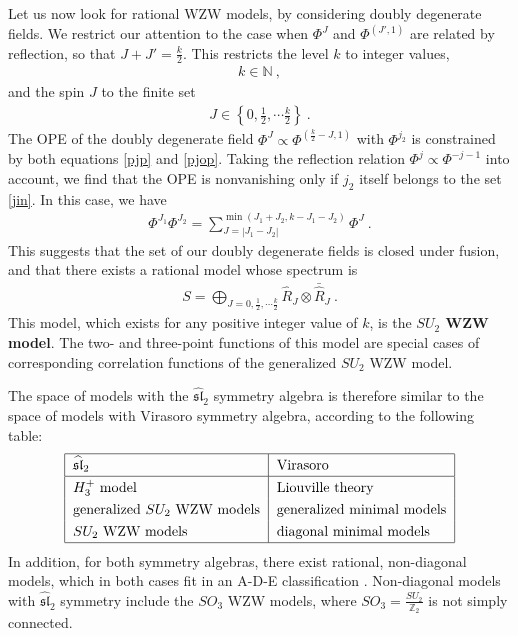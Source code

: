 \documentclass[12pt, a4paper, notitlepage, twoside]{report}
\numberwithin{equation}{section}
\theoremstyle{break}
\begin{document}
Let us now look for rational WZW models, by considering doubly degenerate fields.
We restrict our attention to the case when $\Phi^{J}$ and $\Phi^{(J',1)}$ are related by reflection, so that $J+J'=\frac{k}{2}$.
This restricts the level $k$ to integer values,  
\begin{align}
 \boxed{k\in {\mathbb{N}}}\ ,
\end{align}
and the spin $J$ to the finite set 
\begin{align}
 J\in \left\{0,\frac12,\cdots \frac{k}{2}\right\}\ .
\label{jin}
\end{align}
The OPE of the doubly degenerate field $\Phi^J \propto \Phi^{(\frac{k}{2}-J,1)}$ with $\Phi^{j_2}$ is constrained by both equations \eqref{pjp} and \eqref{pjop}.
Taking the reflection relation $\Phi^j\propto \Phi^{-j-1}$ into account, we find that the OPE is nonvanishing only if $j_2$ itself belongs to the set \eqref{jin}.
In this case, we have 
\begin{align}
\boxed{\Phi^{J_1}\Phi^{J_2} = \sum_{J=|J_1-J_2|}^{\operatorname{min}(J_1+J_2,k-J_1-J_2)} \Phi^J}\ .
\end{align}
This suggests that the set of our doubly degenerate fields is closed under fusion, and that there exists a rational model whose spectrum is
\begin{align}
 \boxed{S = \bigoplus_{J=0,\frac12,\cdots \frac{k}{2}} \hat{R}_J \otimes \bar{\hat{R}}_J}\ .
\end{align}
This model, which exists for any positive integer value of $k$, is the \textbf{\boldmath $SU_2$ WZW model}.
The two- and three-point functions of this model are special cases of corresponding correlation functions of the generalized $SU_2$ WZW model. 

The space of models with the $\widehat{\mathfrak{sl}}_2$ symmetry algebra is therefore similar to the space of models with Virasoro symmetry algebra, according to the following table:
\begin{align}
\renewcommand{\arraystretch}{1.3}
 \begin{tabular}{|l|l|}
  \hline
 $\widehat{\mathfrak{sl}}_2$  & Virasoro 
\\
\hline
$H_3^+$ model & Liouville theory 
\\
generalized $SU_2$ WZW models & generalized minimal models
\\
$SU_2$ WZW models & diagonal minimal models
\\
\hline
 \end{tabular}
\end{align}
In addition, for both symmetry algebras, there exist rational, non-diagonal models, which in both cases fit in an A-D-E classification \cite{fms97}. 
Non-diagonal models with $\widehat{\mathfrak{sl}}_2$ symmetry include the $SO_3$ WZW models, where $SO_3 = \frac{SU_2}{\mathbb{Z}_2}$ is not simply connected.
\end{document}

